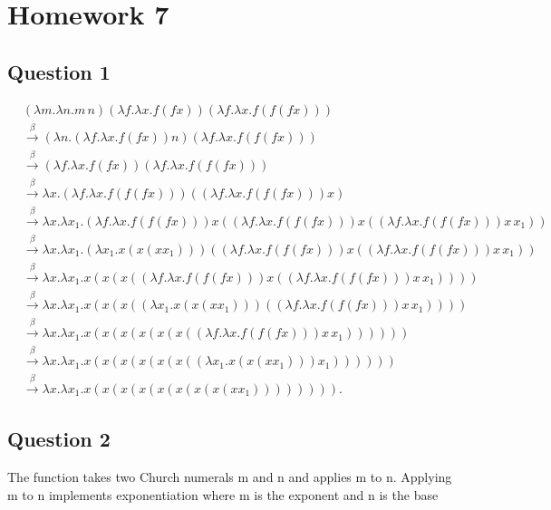 \documentclass{article}
\theoremstyle{plain}
\theoremstyle{definition}
\theoremstyle{remark}
\begin{document}
\section{Homework 7}\label{homework7}

\subsection{Question 1}

\begin{align*}
  & (\lambda m.\lambda n.m \, n)(\lambda f.\lambda x.f(fx))(\lambda f.\lambda x.f(f(fx))) \\
  & \overset{\beta}{\to} (\lambda n.(\lambda f.\lambda x.f(fx))n)(\lambda f.\lambda x.f(f(fx))) \\
  & \overset{\beta}{\to} (\lambda f.\lambda x.f(fx))(\lambda f.\lambda x.f(f(fx))) \\
  & \overset{\beta}{\to} \lambda x.(\lambda f.\lambda x.f(f(fx)))((\lambda f.\lambda x.f(f(fx)))x) \\
  & \overset{\beta}{\to} \lambda x.\lambda x_1.(\lambda f.\lambda x.f(f(fx)))x((\lambda f.\lambda x.f(f(fx)))x((\lambda f.\lambda x.f(f(fx)))x \, x_1)) \\
  & \overset{\beta}{\to} \lambda x.\lambda x_1.(\lambda x_1.x(x(xx_1)))((\lambda f.\lambda x.f(f(fx)))x((\lambda f.\lambda x.f(f(fx)))x \, x_1)) \\
  & \overset{\beta}{\to} \lambda x.\lambda x_1.x(x(x((\lambda f.\lambda x.f(f(fx)))x((\lambda f.\lambda x.f(f(fx)))x \, x_1)))) \\
  & \overset{\beta}{\to} \lambda x.\lambda x_1.x(x(x((\lambda x_1.x(x(xx_1)))((\lambda f.\lambda x.f(f(fx)))x \, x_1)))) \\
  & \overset{\beta}{\to} \lambda x.\lambda x_1.x(x(x(x(x(x((\lambda f.\lambda x.f(f(fx)))x \, x_1)))))) \\
  & \overset{\beta}{\to} \lambda x.\lambda x_1.x(x(x(x(x(x((\lambda x_1.x(x(xx_1)))x_1)))))) \\
  & \overset{\beta}{\to} \lambda x.\lambda x_1.x(x(x(x(x(x(x(x(xx_1)))))))).
\end{align*}


\subsection{Question 2}

The function takes two Church numerals m and n and applies m to n. Applying m to n implements exponentiation where m is the exponent and n is the base
\end{document}
